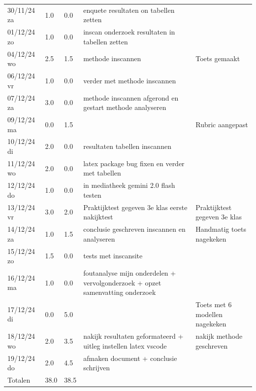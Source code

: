 \documentclass[12pt]{article}
\begin{document}
\begin{longtable}{@{}p{2.5cm} p{1cm} p{1.5cm} p{5cm} p{5cm}}
30/11/24 za & 1.0 & 0.0 & enquete resultaten on tabellen zetten &  \\
01/12/24 zo & 1.0 & 0.0 & inscan onderzoek resultaten in tabellen zetten &  \\
04/12/24 wo & 2.5 & 1.5 & methode inscannen & Toets gemaakt \\
06/12/24 vr & 1.0 & 0.0 & verder met methode inscannen &  \\
07/12/24 za & 3.0 & 0.0 & methode inscannen afgerond en gestart methode analyseren &  \\
09/12/24 ma & 0.0 & 1.5 &  & Rubric aangepast \\
10/12/24 di & 2.0 & 0.0 & resultaten tabellen inscannen &  \\
11/12/24 wo & 2.0 & 0.0 & latex package bug fixen en verder met tabellen &  \\
12/12/24 do & 1.0 & 0.0 & in mediatheek gemini 2.0 flash testen &  \\
13/12/24 vr & 3.0 & 2.0 & Praktijktest gegeven 3e klas eerste nakijktest & Praktijktest gegeven 3e klas \\
14/12/24 za & 1.0 & 1.5 & conclusie geschreven inscannen en analyseren & Handmatig toets nagekeken \\
15/12/24 zo & 1.5 & 0.0 & tests met inscansite &  \\
16/12/24 ma & 1.0 & 0.0 & foutanalyse mijn onderdelen + vervolgonderzoek + opzet samenvatting onderzoek &  \\
17/12/24 di & 0.0 & 5.0 &  & Toets met 6 modellen nagekeken \\
18/12/24 wo & 2.0 & 3.5 & nakijk resultaten geformateerd + uitleg instellen latex vscode & nakijk methode geschreven \\
19/12/24 do & 2.0 & 4.5 & afmaken document + conclusie schrijven &  \\
\midrule 
Totalen & 38.0 & 38.5 & & \\
\bottomrule
\end{longtable}
\normalsize
\end{document}
